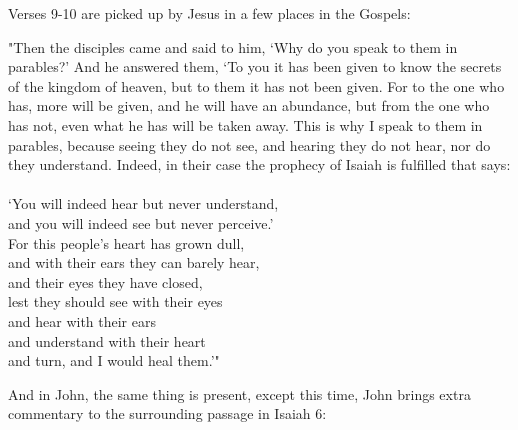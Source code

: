 \documentclass[11pt]{article}
\begin{document}
{\vspace{1em}}

Verses 9-10 are picked up by Jesus in a few places in the Gospels:

{\vspace{1em}}

\begin{versesection}{2em}

 "Then the disciples came and said to him, `Why do you speak to them in parables?'  And he answered them, `To you it has been given to know the secrets of the kingdom of heaven, but to them it has not been given.  For to the one who has, more will be given, and he will have an abundance, but from the one who has not, even what he has will be taken away.  This is why I speak to them in parables, because seeing they do not see, and hearing they do not hear, nor do they understand.  Indeed, in their case the prophecy of Isaiah is fulfilled that says: \\\\`You will indeed hear but never understand,\\ \poetryline{} and you will indeed see but never perceive.'\\  For this people's heart has grown dull,\\ \poetryline{} and with their ears they can barely hear,\\ \poetryline{} and their eyes they have closed, \\ lest they should see with their eyes \\ \poetryline{} and hear with their ears\\ and understand with their heart\\ \poetryline{} and turn, and I would heal them.'"
\end{versesection}

{\vspace{1em}}
And in John, the same thing is present, except this time, John brings extra commentary to the surrounding passage in Isaiah 6:
\end{document}

